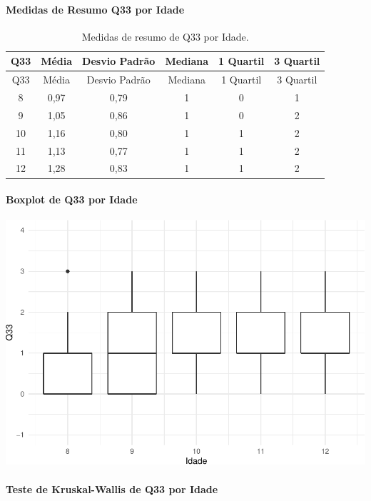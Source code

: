 \documentclass[]{article}
\let\oldparagraph\paragraph
\renewcommand{\paragraph}[1]{\oldparagraph{#1}\mbox{}}
\begin{document}
\cleardoublepage

\hypertarget{medidas-de-resumo-q33-por-idade}{%
\paragraph{Medidas de Resumo Q33 por Idade}\label{medidas-de-resumo-q33-por-idade}}

\begin{longtable}[]{@{}cccccc@{}}
\caption{\label{tab:unnamed-chunk-1157}Medidas de resumo de Q33 por Idade.}\tabularnewline
\toprule
Q33 & Média & Desvio Padrão & Mediana & 1 Quartil & 3 Quartil\tabularnewline
\midrule
\endfirsthead
\toprule
Q33 & Média & Desvio Padrão & Mediana & 1 Quartil & 3 Quartil\tabularnewline
\midrule
\endhead
8 & 0,97 & 0,79 & 1 & 0 & 1\tabularnewline
9 & 1,05 & 0,86 & 1 & 0 & 2\tabularnewline
10 & 1,16 & 0,80 & 1 & 1 & 2\tabularnewline
11 & 1,13 & 0,77 & 1 & 1 & 2\tabularnewline
12 & 1,28 & 0,83 & 1 & 1 & 2\tabularnewline
\bottomrule
\end{longtable}

\hypertarget{boxplot-de-q33-por-idade}{%
\paragraph{Boxplot de Q33 por Idade}\label{boxplot-de-q33-por-idade}}

\begin{center}\includegraphics[width=0.75\linewidth]{relatorio_covid19_files/figure-latex/unnamed-chunk-1158-1} \end{center}

\hypertarget{teste-de-kruskal-wallis-de-q33-por-idade}{%
\paragraph{Teste de Kruskal-Wallis de Q33 por Idade}\label{teste-de-kruskal-wallis-de-q33-por-idade}}
\end{document}
